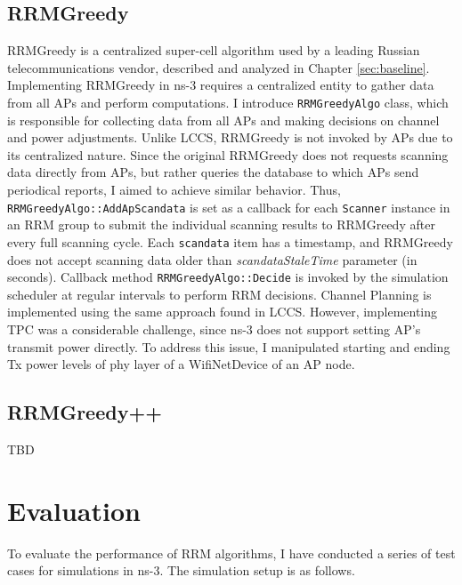 \subsection{RRMGreedy}
\label{chap:impl:sec:implementation:rrmgreedy}
RRMGreedy is a centralized super-cell algorithm used by a leading Russian telecommunications vendor, described and analyzed in Chapter \ref{sec:baseline}.
Implementing RRMGreedy in ns-3 requires a centralized entity to gather data from all APs and perform computations. I introduce \texttt{RRMGreedyAlgo} class, which is responsible for collecting data from all APs and making decisions on channel and power adjustments.
Unlike LCCS, RRMGreedy is not invoked by APs due to its centralized nature. Since the original RRMGreedy does not requests scanning data directly from APs, but rather queries the database to which APs send periodical reports, I aimed to achieve similar behavior.
Thus, \texttt{RRMGreedyAlgo::AddApScandata} is set as a callback for each \texttt{Scanner} instance in an RRM group to submit the individual scanning results to RRMGreedy after every full scanning cycle. Each \texttt{scandata} item has a timestamp, and RRMGreedy does not accept scanning data older than \textit{scandataStaleTime} parameter (in seconds). Callback method \texttt{RRMGreedyAlgo::Decide} is invoked by the simulation scheduler at regular intervals to perform RRM decisions.
Channel Planning is implemented using the same approach found in LCCS. However, implementing TPC was a considerable challenge, since ns-3 does not support setting AP's transmit power directly. To address this issue, I manipulated starting and ending Tx power levels of phy layer of a WifiNetDevice of an AP node.

\subsection{RRMGreedy++}
\label{chap:impl:sec:implementation:rrmv2}

TBD

\section{Evaluation}
\label{chap:impl:sec:eval}
To evaluate the performance of RRM algorithms, I have conducted a series of test cases for simulations in ns-3.
The simulation setup is as follows.
